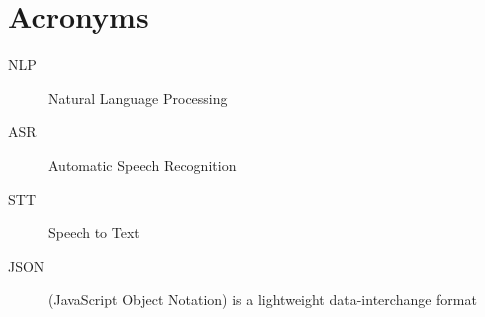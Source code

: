 
\chapter{Acronyms}
\begin{description}
\item[NLP] Natural Language Processing
\item[ASR] Automatic Speech Recognition
\item[STT] Speech to Text
\item[JSON] (JavaScript Object Notation) is a lightweight data-interchange format
\end{description}